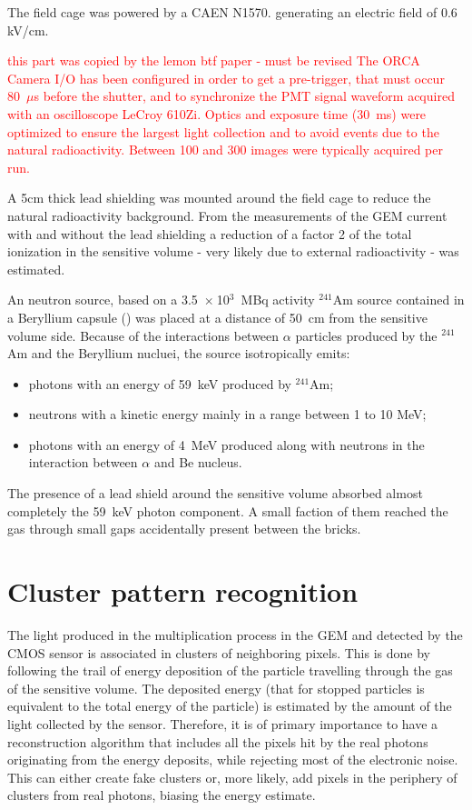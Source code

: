 \documentclass[12pt]{iopart}
\begin{document}
The field cage was powered by a CAEN N1570.\cite{CAENN1570} generating an electric field  of 0.6 kV/cm. 

\textcolor{red}{this part was copied by the lemon btf paper - must be revised}
\textcolor{red}{The ORCA Camera I/O has been configured in order to get a pre-trigger, that must occur 80~$\mu$s before the shutter, and to synchronize the PMT signal waveform acquired with an oscilloscope LeCroy 610Zi. Optics and exposure time (30~ms) were optimized to ensure the largest light collection and to avoid events due to the natural radioactivity. Between 100 and 300 images were typically acquired per run. }

A  5cm thick lead shielding was mounted around the \lemon field cage to reduce the natural radioactivity background. From the measurements of the GEM current with and without the lead shielding a reduction of a factor 2  of the total ionization in the sensitive volume  - very likely due to external radioactivity -  was estimated.

 An neutron source, based on a 3.5~$\times~$10$^3$~MBq activity  $^{241}$Am source contained in a Beryllium capsule (\ambe) was placed at a distance of 50~cm from the sensitive volume side. 
 Because of the interactions between $\alpha$ particles produced by the $^{241}$Am and the Beryllium nucluei, the \ambe source isotropically emits:
 \begin{itemize}
     \item photons with an energy of 59~keV produced by $^{241}$Am;
     \item neutrons with a kinetic energy mainly in a range between 1 to 10 MeV;
     \item photons with an energy of 4~MeV produced along with neutrons in the interaction between $\alpha$ and Be nucleus.
 \end{itemize}
 
The presence of a lead shield around the sensitive volume absorbed almost completely the 59~keV photon component. A small faction of them reached the gas through small gaps accidentally present between the bricks.
 

\clearpage
 
\section{Cluster pattern recognition}
\label{sec:clustering}
The light produced in the multiplication process in the GEM and
detected by the CMOS sensor is associated in clusters of neighboring
pixels. This is done by following the trail of energy deposition of the particle travelling
through the gas of the sensitive volume. The deposited energy  (that for stopped particles is equivalent to the total energy of the particle)
 is estimated by the amount of the light
collected by the sensor.  Therefore, it is of primary importance to
have a reconstruction algorithm that  includes all  the pixels
hit by the real photons originating from the energy deposits, while
rejecting most of the electronic noise. This can either create fake
clusters or, more likely, add pixels in the periphery of clusters from
real photons, biasing the energy estimate.
\end{document}
